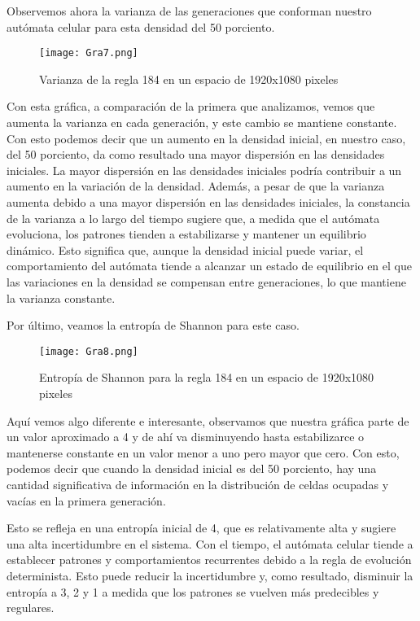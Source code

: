 \documentclass{article}
\begin{document}
\begin{itemize}
		Observemos ahora la varianza de las generaciones que conforman nuestro autómata celular para esta densidad del 50 porciento. 
		
		\begin{figure}[h]
			\centering       
			\texttt{[image: Gra7.png]}
			\caption{Varianza de la regla 184 en un espacio de 1920x1080 pixeles}
			\label{fig:mi_imagen1}
		\end{figure}
		\vspace{30pt}
		Con esta gráfica, a comparación de la primera que analizamos, vemos que aumenta la varianza en cada generación, y este cambio se mantiene constante. Con esto podemos decir que un aumento en la densidad inicial, en nuestro caso, del 50 porciento, da como resultado una mayor dispersión en las densidades iniciales. La mayor dispersión en las densidades iniciales podría contribuir a un aumento en la variación de la densidad.
		Además, a pesar de que la varianza aumenta debido a una mayor dispersión en las densidades iniciales, la constancia de la varianza a lo largo del tiempo sugiere que, a medida que el autómata evoluciona, los patrones tienden a estabilizarse y mantener un equilibrio dinámico. Esto significa que, aunque la densidad inicial puede variar, el comportamiento del autómata tiende a alcanzar un estado de equilibrio en el que las variaciones en la densidad se compensan entre generaciones, lo que mantiene la varianza constante.
		\vspace{100pt}
	
		Por último, veamos la entropía de Shannon para este caso.
		
		\begin{figure}[h]
			\centering       
			\texttt{[image: Gra8.png]}
			\caption{Entropía de Shannon para la regla 184 en un espacio de 1920x1080 pixeles}
			\label{fig:mi_imagen1}
		\end{figure}
		
		Aquí vemos algo diferente e interesante, observamos que nuestra gráfica parte de un valor aproximado a 4 y de ahí va disminuyendo hasta estabilizarce o mantenerse constante en un valor menor a uno pero mayor que cero. Con esto, podemos decir que cuando la densidad inicial es del 50 porciento, hay una cantidad significativa de información en la distribución de celdas ocupadas y vacías en la primera generación.
		
		 Esto se refleja en una entropía inicial de 4, que es relativamente alta y sugiere una alta incertidumbre en el sistema.
		Con el tiempo, el autómata celular tiende a establecer patrones y comportamientos recurrentes debido a la regla de evolución determinista. Esto puede reducir la incertidumbre y, como resultado, disminuir la entropía a 3, 2 y 1 a medida que los patrones se vuelven más predecibles y regulares.
		

\end{itemize}
\end{document}
